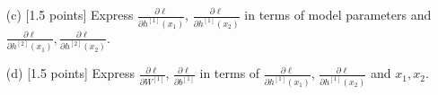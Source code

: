 \documentclass{article}
\newif\ifsolutions
\newenvironment{labelledanswer}{{\bf Answer:} \sf }{}%
\newcommand{\answer}[2]
{{
\ifsolutions
\begin{labelledanswer}
\color{red} 
#2
\end{labelledanswer}
\else
#1
\fi
}}
\begin{document}
\begin{itemize}
{    }
    
    \item [(c)] [1.5 points] Express $\frac{\partial \ell}{\partial h^{[1]}(x_1)}$, $\frac{\partial \ell}{\partial h^{[1]}(x_2)}$ in terms of model parameters and $\frac{\partial \ell}{\partial h^{[2]}(x_1)}, \frac{\partial \ell}{\partial h^{[2]}(x_2)}$.
    
    \answer{}{
$$
\frac{\partial \ell}{\partial h^{[1]}(x_1)} 
= 
\frac{\partial \ell}{\partial h^{[2]}(x_1)} 
\frac{\partial h^{[2]}(x_1)}{\partial a^{[1]}(x_1)}
\frac{\partial a^{[1]}(x_1)}{\partial h^{[1]}(x_1)} 
$$
$$
= 
\frac{\partial \ell}{\partial h^{[2]}(x_1)} 
\frac{\partial}{\partial a^{[1]}(x_1)} (W^{[2]}a^{[1]}(x_1) + b^{[2]})
\frac{\partial}{\partial h^{[1]}(x_1)} sigmoid(h^{[1]}(x_1))
$$
$$
= 
\frac{\partial \ell}{\partial h^{[2]}(x_1)} (W^{[2]}) (\sigma(h^{[1]}(x_1)))(1-\sigma(h^{[1]}(x_1)))
$$    
$$
= 
\frac{\partial \ell}{\partial h^{[2]}(x_1)} (W^{[2]}) (\sigma( W^{[1]}x_1 + b^{[1]}))(1-\sigma( W^{[1]}x_1 + b^{[1]}))
$$
    
$$
\frac{\partial \ell}{\partial h^{[1]}(x_2)}
$$
$$
= 
\frac{\partial \ell}{\partial h^{[2]}(x_2)} 
\frac{\partial h^{[2]}(x_2)}{\partial a^{[1]}(x_2)}
\frac{\partial a^{[1]}(x_2)}{\partial h^{[1]}(x_2)} 
$$
$$
= 
\frac{\partial \ell}{\partial h^{[2]}(x_2)} 
\frac{\partial}{\partial a^{[1]}(x_2)} (W^{[2]}a^{[1]}(x_2) + b^{[2]})
\frac{\partial}{\partial h^{[1]}(x_2)} \sigma(h^{[1]}(x_2))
$$
$$
= 
\frac{\partial \ell}{\partial h^{[2]}(x_2)} (W^{[2]}) (\sigma(h^{[1]}(x_2)))(1-\sigma(h^{[1]}(x_2)))
$$    
$$
= 
\frac{\partial \ell}{\partial h^{[2]}(x_2)} (W^{[2]}) (\sigma( W^{[1]}x_2 + b^{[1]}))(1-\sigma( W^{[1]}x_2 + b^{[1]}))
$$

    }
    
    \item [(d)] [1.5 points] Express $\frac{\partial \ell}{\partial W^{[1]}}$, $\frac{\partial \ell}{\partial b^{[1]}}$ in terms of $\frac{\partial \ell}{\partial h^{[1]}(x_1)}$, $\frac{\partial \ell}{\partial h^{[1]}(x_2)}$ and $x_1, x_2$.
    

\end{itemize}
\end{document}
